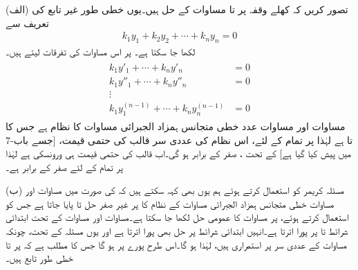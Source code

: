 
(الف) \quad تصور کریں کہ کھلے وقفہ  پر   تا  مساوات  کے حل ہیں۔یوں خطی طور غیر تابع کی تعریف سے 
\begin{align}\label{مساوات_سادہ_بلند_ورونسکی_ب}
k_1y_1+k_2y_2+\cdots+k_ny_n=0
\end{align}
لکھا جا سکتا ہے۔  پر اس مساوات کی  تفرقات لیتے ہیں۔
\begin{gather}
\begin{aligned}\label{مساوات_سادہ_بلند_ورونسکی_پ}
k_1y'_1+\cdots+k_ny'_n&=0\\
k_1y''_1+\cdots+k_ny''_n&=0\\
\vdots &\\
k_1y^{(n-1)}_1+\cdots+k_ny^{(n-1)}_n&=0
\end{aligned}
\end{gather}
مساوات  اور مساوات   عدد خطی متجانس ہمزاد  الجبرائی مساوات کا نظام ہے جس کا   تا  ہے لہٰذا  پر تمام  کے لئے، اس نظام کی عددی سر قالب کی حتمی قیمت،  [جسے باب-7 میں پیش کیا گیا ہے] کے تحت ،  صفر کے برابر ہو گی۔اب قالب کی حتمی قیمت ہی ورونسکی ہے لہٰذا  پر تمام  کے لئے  صفر کے برابر ہے۔

(ب) \quad مسئلہ کریمر کو استعمال کرتے ہوئے ہم یوں بھی کہہ سکتے ہیں کہ  کی صورت میں مساوات  اور مساوات  خطی متجانس ہمزاد  الجبرائی مساوات کے نظام کا  پر غیر صفر حل  تا  پایا جاتا ہے جس کو استعمال کرتے ہوئے،  پر مساوات  کا عمومی حل لکھا جا سکتا ہے۔مساوات  اور مساوات   کے تحت   ابتدائی شرائط  تا  پر پورا اترتا ہے۔انہیں ابتدائی شرائط پر حل  بھی پورا اترتا ہے اور یوں مسئلہ  کے تحت، چونکہ  مساوات  کے عددی سر  پر استمراری ہیں، لہٰذا  ہو گا۔اس طرح  پورے  پر ہو گا جس کا مطلب ہے کہ   پر  تا  خطی طور تابع ہیں۔

